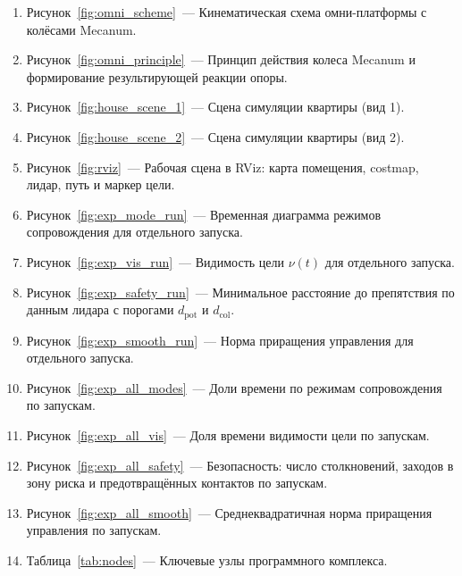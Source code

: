 
\begin{enumerate}
      \item Рисунок~\ref{fig:omni_scheme}~--- Кинематическая схема омни-платформы с колёсами Mecanum.
      \item Рисунок~\ref{fig:omni_principle}~--- Принцип действия колеса Mecanum и формирование результирующей реакции опоры.
      \item Рисунок~\ref{fig:house_scene_1}~--- Сцена симуляции квартиры (вид 1).
      \item Рисунок~\ref{fig:house_scene_2}~--- Сцена симуляции квартиры (вид 2).
      \item Рисунок~\ref{fig:rviz}~--- Рабочая сцена в RViz: карта помещения, costmap, лидар, путь и маркер цели.
      \item Рисунок~\ref{fig:exp_mode_run}~--- Временная диаграмма режимов сопровождения для отдельного запуска.
      \item Рисунок~\ref{fig:exp_vis_run}~--- Видимость цели $\nu(t)$ для отдельного запуска.
      \item Рисунок~\ref{fig:exp_safety_run}~--- Минимальное расстояние до препятствия по данным лидара с порогами $d_{\text{pot}}$ и $d_{\text{col}}$.
      \item Рисунок~\ref{fig:exp_smooth_run}~--- Норма приращения управления для отдельного запуска.
      \item Рисунок~\ref{fig:exp_all_modes}~--- Доли времени по режимам сопровождения по запускам.
      \item Рисунок~\ref{fig:exp_all_vis}~--- Доля времени видимости цели по запускам.
      \item Рисунок~\ref{fig:exp_all_safety}~--- Безопасность: число столкновений, заходов в зону риска и предотвращённых контактов по запускам.
      \item Рисунок~\ref{fig:exp_all_smooth}~--- Среднеквадратичная норма приращения управления по запускам.
      \item Таблица~\ref{tab:nodes}~--- Ключевые узлы программного комплекса.
\end{enumerate}
